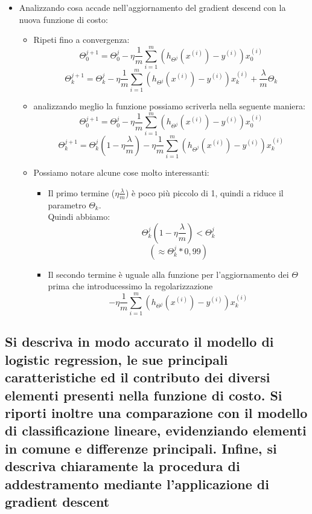 \documentclass[10pt,oneside,a4paper]{article}
\begin{document}
\begin{itemize}
\item Analizzando cosa accade nell'aggiornamento del gradient descend con la nuova funzione di costo:

\begin{itemize}
\item Ripeti fino a convergenza:
$$\Theta_{0}^{j+1}=\Theta_{0}^{j}-\eta \frac{1}{m} \sum_{i=1}^{m}(h_{\Theta^{j}}(x^{(i)})-y^{(i)})x_{0}^{(i)}$$
$$\Theta_{k}^{j+1}=\Theta_{k}^{j}-\eta \frac{1}{m}\sum_{i=1}^{m}(h_{\Theta^{j}}(x^{(i)})-y^{(i)})x_{k}^{(i)}+\frac{\lambda}{m}\Theta_{k}$$
\item analizzando meglio la funzione possiamo scriverla nella seguente maniera:
$$\Theta_{0}^{j+1}=\Theta_{0}^{j}-\eta \frac{1}{m} \sum_{i=1}^{m}(h_{\Theta^{j}}(x^{(i)})-y^{(i)})x_{0}^{(i)}$$
$$\Theta_{k}^{j+1}=\Theta_{k}^{j}(1-\eta \frac{\lambda}{m} )-\eta \frac{1}{m}\sum_{i=1}^{m}(h_{\Theta^{j}}(x^{(i)})-y^{(i)})x_{k}^{(i)}$$

\item Possiamo notare alcune cose molto interessanti:
\begin{itemize}
\item Il primo termine ($\eta \frac{\lambda}{m}$) è poco più piccolo di 1, quindi a riduce il parametro $\Theta_{k}$. \\
Quindi abbiamo:
$$\Theta_{k}^{j}(1-\eta \frac{\lambda}{m} ) < \Theta_{k}^{j}$$ $$ (\approx \Theta_{k}^{j} * 0,99)$$ 
\item Il secondo termine è uguale alla funzione per l'aggiornamento dei $\Theta$ prima che introducessimo la regolarizzazione
$$-\eta \frac{1}{m}\sum_{i=1}^{m}(h_{\Theta^{j}}(x^{(i)})-y^{(i)})x_{k}^{(i)}$$
\end{itemize}

\end{itemize}


\end{itemize}



\subsection{Si descriva in modo accurato il modello di logistic regression, le sue principali caratteristiche
	ed il contributo dei diversi elementi presenti nella funzione di costo. Si riporti inoltre
	una comparazione con il modello di classificazione lineare, evidenziando elementi in comune
	e differenze principali. Infine, si descriva chiaramente la procedura di addestramento
	mediante l’applicazione di gradient descent}
\end{document}
